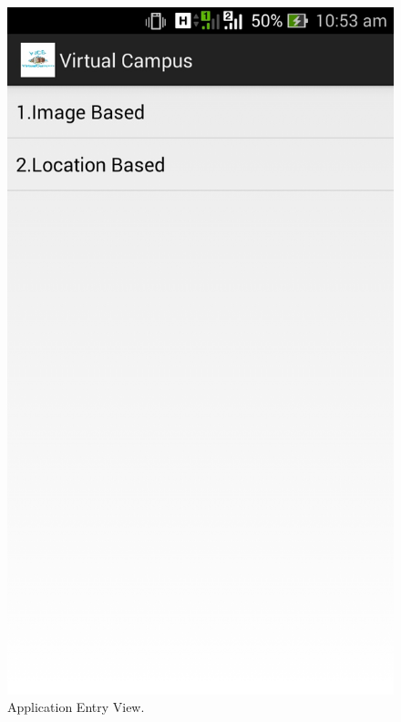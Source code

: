 \documentclass{article}
\begin{document}
\begin{center}
\begin{figure}[h]
	\includegraphics[scale=0.3,trim=0 30cm 0 0,clip=true]{AppEntryView.jpg}
	\caption{Application Entry View. }
\end{figure}
\end{center}
\end{document}
